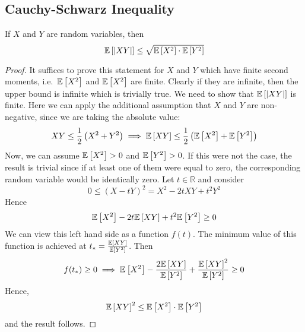 \subsection{Cauchy-Schwarz Inequality}
\begin{theorem}
	If \(X\) and \(Y\) are random variables, then
	\[
		\mathbb{E}\left[{\abs{XY}}\right] \leq \sqrt{\mathbb{E}\left[{X^2}\right]\cdot\mathbb{E}\left[{Y^2}\right]}
	\]
\end{theorem}
\begin{proof}
	It suffices to prove this statement for \(X\) and \(Y\) which have finite second moments, i.e.\ \(\mathbb{E}\left[{X^2}\right]\) and \(\mathbb{E}\left[{X^2}\right]\) are finite.
	Clearly if they are infinite, then the upper bound is infinite which is trivially true.
	We need to show that \(\mathbb{E}\left[{\abs{XY}}\right]\) is finite.
	Here we can apply the additional assumption that \(X\) and \(Y\) are non-negative, since we are taking the absolute value:
	\[
		XY \leq \frac{1}{2}\left(X^2 + Y^2\right) \implies \mathbb{E}\left[{XY}\right] \leq \frac{1}{2}\left( \mathbb{E}\left[{X^2}\right] + \mathbb{E}\left[{Y^2}\right]  \right)
	\]
	Now, we can assume \(\mathbb{E}\left[{X^2}\right] > 0\) and \(\mathbb{E}\left[{Y^2}\right] > 0\).
	If this were not the case, the result is trivial since if at least one of them were equal to zero, the corresponding random variable would be identically zero.
	Let \(t \in \mathbb R\) and consider
	\[
		0 \leq (X - tY)^2 = X^2 - 2tXY + t^2Y^2
	\]
	Hence
	\[
		\mathbb{E}\left[{X^2}\right] - 2t\mathbb{E}\left[{XY}\right] + t^2\mathbb{E}\left[{Y^2}\right] \geq 0
	\]
	We can view this left hand side as a function \(f(t)\).
	The minimum value of this function is achieved at \(t_\ast = \frac{\mathbb{E}\left[{XY}\right]}{\mathbb{E}\left[{Y^2}\right]}\).
	Then
	\[
		f(t_\ast) \geq 0 \implies \mathbb{E}\left[{X^2}\right] - \frac{2\mathbb{E}\left[{XY}\right]}{\mathbb{E}\left[{Y^2}\right]} + \frac{\mathbb{E}\left[{XY}\right]^2}{\mathbb{E}\left[{Y^2}\right]} \geq 0
	\]
	Hence,
	\[
		\mathbb{E}\left[{XY}\right]^2 \leq \mathbb{E}\left[{X^2}\right]\cdot \mathbb{E}\left[{Y^2}\right]
	\]
	and the result follows.
\end{proof}
